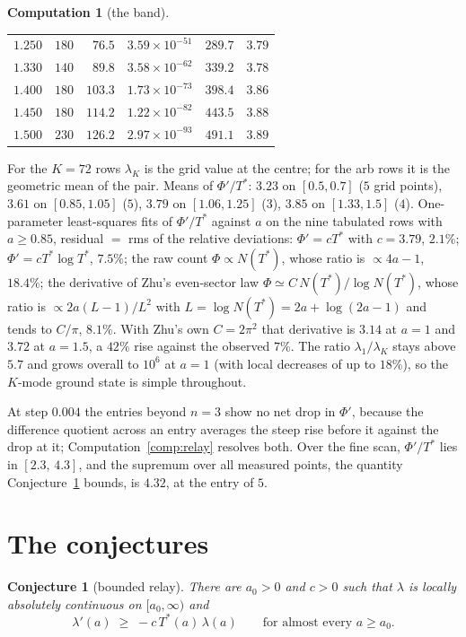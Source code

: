 \documentclass[11pt]{article}
\newtheorem{conjecture}[theorem]{Conjecture}
\theoremstyle{definition}
\newtheorem{computation}[theorem]{Computation}
\theoremstyle{remark}
\newcommand{\Tst}{T^{*}}
\begin{document}
\begin{computation}[the band]
\begin{center}
\begin{tabular}{@{}rrrcrc@{}}
$1.250$ & $180$ & $76.5$ & $3.59\times10^{-51}$ & $289.7$ & $3.79$\\
$1.330$ & $140$ & $89.8$ & $3.58\times10^{-62}$ & $339.2$ & $3.78$\\
$1.400$ & $180$ & $103.3$ & $1.73\times10^{-73}$ & $398.4$ & $3.86$\\
$1.450$ & $180$ & $114.2$ & $1.22\times10^{-82}$ & $443.5$ & $3.88$\\
$1.500$ & $230$ & $126.2$ & $2.97\times10^{-93}$ & $491.1$ & $3.89$\\
\bottomrule
\end{tabular}
\end{center}
For the $K=72$ rows $\lambda_K$ is the grid value at the centre; for the arb rows it is the geometric mean of the pair. Means of $\Phi'/\Tst$: $3.23$ on $[0.5,0.7]$ ($5$ grid points), $3.61$ on $[0.85,1.05]$ ($5$), $3.79$ on $[1.06,1.25]$ ($3$), $3.85$ on $[1.33,1.5]$ ($4$). One-parameter least-squares fits of $\Phi'/\Tst$ against $a$ on the nine tabulated rows with $a\ge0.85$, residual $=$ rms of the relative deviations: $\Phi'=c\Tst$ with $c=3.79$, $2.1\%$; $\Phi'=c\Tst\log\Tst$, $7.5\%$; the raw count $\Phi\propto N(\Tst)$, whose ratio is $\propto 4a-1$, $18.4\%$; the derivative of Zhu's even-sector law $\Phi\simeq C\,N(\Tst)/\log N(\Tst)$, whose ratio is $\propto 2a(L-1)/L^2$ with $L=\log N(\Tst)=2a+\log(2a-1)$ and tends to $C/\pi$, $8.1\%$. With Zhu's own $C=2\pi^2$ that derivative is $3.14$ at $a=1$ and $3.72$ at $a=1.5$, a $42\%$ rise against the observed $7\%$. The ratio $\lambda_1/\lambda_K$ stays above $5.7$ and grows overall to $10^6$ at $a=1$ (with local decreases of up to $18\%$), so the $K$-mode ground state is simple throughout.
\end{computation}

At step $0.004$ the entries beyond $n=3$ show no net drop in $\Phi'$, because the difference quotient across an entry averages the steep rise before it against the drop at it; Computation~\ref{comp:relay} resolves both. Over the fine scan, $\Phi'/\Tst$ lies in $[2.3,\,4.3]$, and the supremum over all measured points, the quantity Conjecture~\ref{conj:A} bounds, is $4.32$, at the entry of $5$.

\section{The conjectures}\label{sec:conj}

\begin{conjecture}[bounded relay]\label{conj:A}
There are $a_0>0$ and $c>0$ such that $\lambda$ is locally absolutely continuous on $[a_0,\infty)$ and
\[
\lambda'(a)\;\ge\;-c\,\Tst(a)\,\lambda(a)\qquad\text{for almost every }a\ge a_0 .
\]
\end{conjecture}
\end{document}
